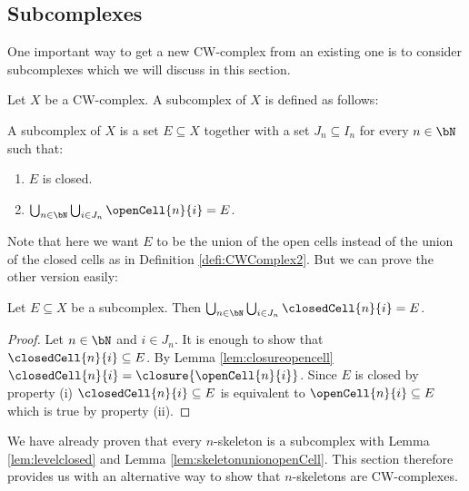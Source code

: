 \subsection{Subcomplexes}\label{sec:mathsubcomplex}

One important way to get a new CW-complex from an existing one is to consider subcomplexes which we will discuss in this section. 

Let $X$ be a CW-complex. A subcomplex of $X$ is defined as follows:

\begin{defi} \label{defi:subcomplex}
    A subcomplex of $X$ is a set $E \subseteq X$ together with a set $J_n \subseteq I_n$ for every $n \in \bN$ such that:
    \href{https://github.com/scholzhannah/CWComplexes/blob/7be4872a05b534011cc969eb5b80a4b7f0bf57e2/CWcomplexes/subcomplex.lean#L44-L52}{\faExternalLink}
    \begin{enumerate}
        \item $E$ is closed.
        \item $\bigcup_{n \in \bN} \bigcup_{i \in J_n} \openCell{n}{i} = E$.
    \end{enumerate}
\end{defi}

Note that here we want $E$ to be the union of the open cells instead of the union of the closed cells as in Definition \ref{defi:CWComplex2}. 
But we can prove the other version easily: 

\begin{lem} \label{lem:subcomplexunionclosed}
    Let $E \subseteq X$ be a subcomplex. 
    Then $\bigcup_{n \in \bN} \bigcup_{i \in J_n} \closedCell{n}{i} = E$.
    \href{https://github.com/scholzhannah/CWComplexes/blob/7be4872a05b534011cc969eb5b80a4b7f0bf57e2/CWcomplexes/subcomplex.lean#L98-L108}{\faExternalLink}
\end{lem}
\begin{proof}
    Let $n \in \bN$ and $i \in J_n$. 
    It is enough to show that $\closedCell{n}{i} \subseteq E$. 
    By Lemma \ref{lem:closureopencell} $\closedCell{n}{i} = \closure{\openCell{n}{i}}$. 
    Since $E$ is closed by property (i) $\closedCell{n}{i} \subseteq E$ is equivalent to $\openCell{n}{i} \subseteq E$ which is true by property (ii).
\end{proof}

\begin{example}
    We have already proven that every $n$-skeleton is a subcomplex with Lemma \ref{lem:levelclosed} and Lemma \ref{lem:skeletonunionopenCell}. 
    \href{https://github.com/scholzhannah/CWComplexes/blob/7be4872a05b534011cc969eb5b80a4b7f0bf57e2/CWcomplexes/subcomplex.lean#L410-L411}{\faExternalLink}
    This section therefore provides us with an alternative way to show that $n$-skeletons are CW-complexes.
\end{example}

